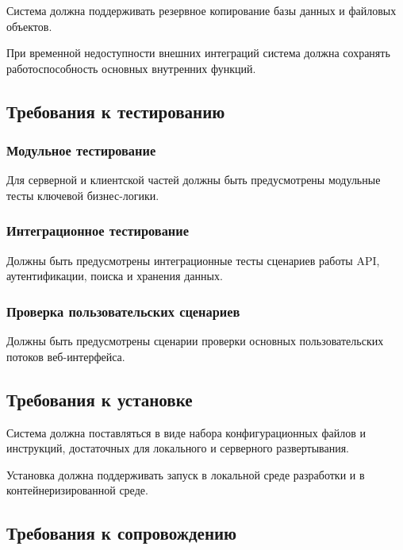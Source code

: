 Система должна поддерживать резервное копирование базы данных и файловых объектов.

При временной недоступности внешних интеграций система должна сохранять работоспособность основных внутренних функций.

\textheadingsep
\subsection{Требования к тестированию}

\headingtextsep

\subsubsection{Модульное тестирование}

Для серверной и клиентской частей должны быть предусмотрены модульные тесты ключевой бизнес-логики.

\subsubsection{Интеграционное тестирование}

Должны быть предусмотрены интеграционные тесты сценариев работы API, аутентификации, поиска и хранения данных.

\subsubsection{Проверка пользовательских сценариев}

Должны быть предусмотрены сценарии проверки основных пользовательских потоков веб-интерфейса.

\textheadingsep
\subsection{Требования к установке}

\headingtextsep

Система должна поставляться в виде набора конфигурационных файлов и инструкций, достаточных для локального и серверного развертывания.

Установка должна поддерживать запуск в локальной среде разработки и в контейнеризированной среде.

\textheadingsep
\subsection{Требования к сопровождению}

